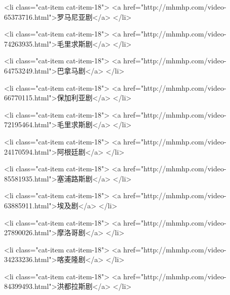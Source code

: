                             <li class="cat-item cat-item-18">
                                <a href="http://mhmhp.com/video-65373716.html">罗马尼亚剧</a>
                            </li>
                            
                            <li class="cat-item cat-item-18">
                                <a href="http://mhmhp.com/video-74263935.html">毛里求斯剧</a>
                            </li>
                            
                            <li class="cat-item cat-item-18">
                                <a href="http://mhmhp.com/video-64753249.html">巴拿马剧</a>
                            </li>
                            
                            <li class="cat-item cat-item-18">
                                <a href="http://mhmhp.com/video-66770115.html">保加利亚剧</a>
                            </li>
                            
                            <li class="cat-item cat-item-18">
                                <a href="http://mhmhp.com/video-72195464.html">毛里求斯剧</a>
                            </li>
                            
                            <li class="cat-item cat-item-18">
                                <a href="http://mhmhp.com/video-24170594.html">阿根廷剧</a>
                            </li>
                            
                            <li class="cat-item cat-item-18">
                                <a href="http://mhmhp.com/video-85581935.html">塞浦路斯剧</a>
                            </li>
                            
                            <li class="cat-item cat-item-18">
                                <a href="http://mhmhp.com/video-63885911.html">埃及剧</a>
                            </li>
                            
                            <li class="cat-item cat-item-18">
                                <a href="http://mhmhp.com/video-27890026.html">摩洛哥剧</a>
                            </li>
                            
                            <li class="cat-item cat-item-18">
                                <a href="http://mhmhp.com/video-34233236.html">喀麦隆剧</a>
                            </li>
                            
                            <li class="cat-item cat-item-18">
                                <a href="http://mhmhp.com/video-84399493.html">洪都拉斯剧</a>
                            </li>
                            
